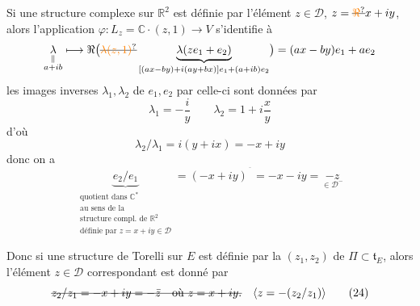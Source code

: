 Si une structure complexe sur $\mathbb R^2$ est définie par l'élément $z\in\mathscr D$, $z=\deleted{\unsure{\Re}}x+iy$, alors l'application  $\varphi\colon L_z=\mathbb C\cdot(z,1)\longrightarrow V$ s'identifie à
\[
 \underset{\substack{\Vert\\a+ib}}{\lambda}\longmapsto
 \Re\bigl(\deleted{\unsure{\lambda(z,1)}}\underbrace{\lambda(ze_1+e_2)}_{[(ax-by)+i(ay+bx)]e_1+(a+ib)e_2}\bigr)=(ax-by)e_1+ae_2
\]
les images inverses $\lambda_1,\lambda_2$ de $e_1,e_2$ par celle-ci sont données par
\[
 \lambda_1=-\frac{i}{y}\qquad\lambda_2=1+i\frac{x}{y}
\]
d'où
\[
 \lambda_2/\lambda_1=i(y+ix)=-x+iy
\]
donc on a
\[
 \underbrace{e_2/e_1}_{\substack{\text{quotient dans }\mathbb C^*\\
 \text{au sens de la}\\\text{structure compl. de }\mathbb R^2\\
 \text{définie par }z=x+iy\in\mathscr D}}
 =(-x+iy)^{\overline{\phantom{x}}}=-x-iy=\underset{\in\mathscr D^-}{-z}
\]

Donc si une structure de Torelli sur $E$ est définie par la  $(z_1,z_2)$ de $\Pi\subset\mathfrak t_E$, alors l'élément $z\in\mathscr D$ correspondant est donné par
\[
 \deleted{z_2/z_1=-x+iy=-\bar z\quad\text{où }z=x+iy.}
 \quad\inserted{z=-(z_2/z_1)} \tag*{(24)}
\]

